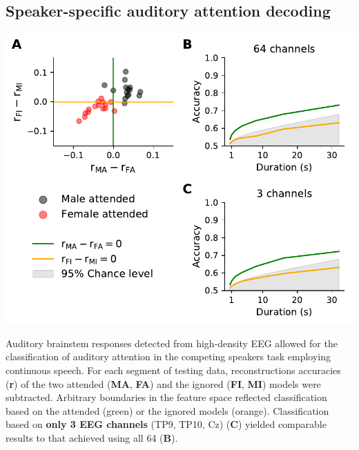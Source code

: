 \documentclass[a0,landscape]{a0poster}
\newenvironment{Figure}
  {\par\medskip\noindent\minipage{\linewidth}}
  {\endminipage\par\medskip}
\begin{document}
\begin{multicols*}{3}
\subsection*{Speaker-specific auditory attention decoding}
\vspace{0.7cm}
\begin{Figure}
\centering
\includegraphics[width=\linewidth,keepaspectratio]{Figure_5.pdf}
\end{Figure}
\endminipage\hfill
{}
\begin{flushleft}
Auditory brainstem responses detected from high-density EEG allowed for the classification of auditory attention in the competing speakers task employing continuous speech. For each segment of testing data, reconstructions accuracies (\textbf{r}) of the two attended (\textbf{MA}, \textbf{FA}) and the ignored (\textbf{FI}, \textbf{MI}) models were subtracted. Arbitrary boundaries in the feature space reflected classification based on the attended (green) or the ignored models (orange). Classification based on \textbf{only 3 EEG channels} (TP9, TP10, Cz) (\textbf{C}) yielded comparable results to that achieved using all 64 (\textbf{B}).
\end{flushleft}
\endminipage\hfill
\vspace{0.5cm}


\end{multicols*}
\end{document}
